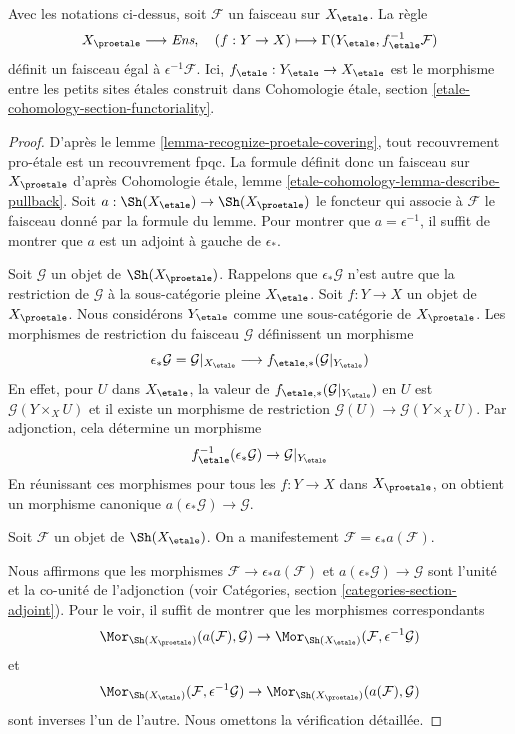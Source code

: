 \begin{lemma}
\label{lemma-describe-pullback-from-etale}
Avec les notations ci-dessus, soit $\mathcal{F}$ un faisceau sur $X_\etale$.
La règle
$$
X_\proetale \longrightarrow \textit{Ens},\quad
(f : Y \to X) \longmapsto \Gamma(Y_\etale, f_\etale^{-1}\mathcal{F})
$$
définit un faisceau égal à $\epsilon^{-1}\mathcal{F}$.
Ici, $f_\etale : Y_\etale \to X_\etale$ est le morphisme
entre les petits sites \'etales construit dans
Cohomologie \'etale, section \ref{etale-cohomology-section-functoriality}.
\end{lemma}

\begin{proof}
D'après le lemme \ref{lemma-recognize-proetale-covering}, tout recouvrement pro-\'etale
est un recouvrement fpqc. La formule définit donc un faisceau sur $X_\proetale$
d'après Cohomologie \'etale, lemme \ref{etale-cohomology-lemma-describe-pullback}.
Soit $a : \Sh(X_\etale) \to \Sh(X_\proetale)$ le foncteur
qui associe à $\mathcal{F}$ le faisceau donné par la formule du lemme.
Pour montrer que $a = \epsilon^{-1}$, il suffit de montrer que $a$ est un
adjoint à gauche de $\epsilon_*$.

\medskip\noindent
Soit $\mathcal{G}$ un objet de $\Sh(X_\proetale)$.
Rappelons que $\epsilon_*\mathcal{G}$ n'est autre que la restriction de
$\mathcal{G}$ à la sous-catégorie pleine $X_\etale$.
Soit $f : Y \to X$ un objet de $X_\proetale$.
Nous considérons $Y_\etale$ comme une sous-catégorie de $X_\proetale$.
Les morphismes de restriction du faisceau $\mathcal{G}$ définissent un morphisme
$$
\epsilon_*\mathcal{G} = \mathcal{G}|_{X_\etale}
\longrightarrow
f_{\etale, *}(\mathcal{G}|_{Y_\etale})
$$
En effet, pour $U$ dans $X_\etale$, la valeur de
$f_{\etale, *}(\mathcal{G}|_{Y_\etale})$ en $U$
est $\mathcal{G}(Y \times_X U)$ et il existe un morphisme de restriction
$\mathcal{G}(U) \to \mathcal{G}(Y \times_X U)$.
Par adjonction, cela détermine un morphisme
$$
f_\etale^{-1}(\epsilon_*\mathcal{G}) \to \mathcal{G}|_{Y_\etale}
$$
En réunissant ces morphismes pour tous les $f : Y \to X$ dans $X_\proetale$,
on obtient un morphisme canonique $a(\epsilon_*\mathcal{G}) \to \mathcal{G}$.

\medskip\noindent
Soit $\mathcal{F}$ un objet de $\Sh(X_\etale)$. On a manifestement
$\mathcal{F} = \epsilon_*a(\mathcal{F})$.

\medskip\noindent 
Nous affirmons que les morphismes $\mathcal{F} \to \epsilon_*a(\mathcal{F})$ et
$a(\epsilon_*\mathcal{G}) \to \mathcal{G}$
sont l'unité et la co-unité de l'adjonction (voir
Catégories, section \ref{categories-section-adjoint}).
Pour le voir, il suffit de montrer que les morphismes correspondants
$$
\Mor_{\Sh(X_\proetale)}(a(\mathcal{F}), \mathcal{G}) \to
\Mor_{\Sh(X_\etale)}(\mathcal{F}, \epsilon^{-1}\mathcal{G})
$$
et
$$
\Mor_{\Sh(X_\etale)}(\mathcal{F}, \epsilon^{-1}\mathcal{G}) \to
\Mor_{\Sh(X_\proetale)}(a(\mathcal{F}), \mathcal{G})
$$
sont inverses l'un de l'autre. Nous omettons la vérification détaillée.
\end{proof}

